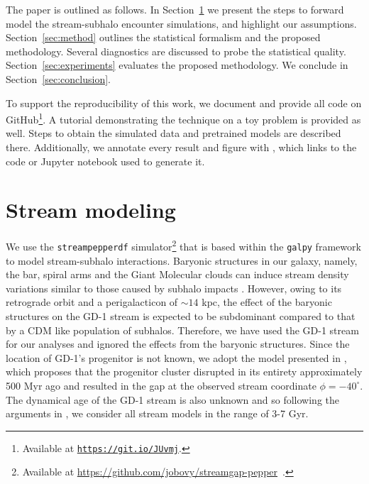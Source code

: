 \documentclass[fleqn,usenatbib]{mnras}
\begin{document}
\bigskip

The paper is outlined as follows. In Section~\ref{sec:stream_modeling} we present the steps to forward model the stream-subhalo encounter simulations, and highlight our assumptions.
Section~\ref{sec:method} outlines the statistical formalism and the proposed methodology.
Several diagnostics are discussed to probe the statistical quality.
Section~\ref{sec:experiments} evaluates the proposed methodology.
We conclude in Section~\ref{sec:conclusion}. 

\medskip

To support the reproducibility of this work,
we document and provide all code on GitHub\footnote{Available at \href{https://github.com/JoeriHermans/constraining-dark-matter-with-stellar-streams-and-ml}{\texttt{https://git.io/JUvmj}}.}.
A tutorial demonstrating the technique on a toy problem is provided as well.
Steps to obtain the simulated data and pretrained models are described there.
Additionally, we annotate every result and figure with , which links to the code or Jupyter notebook used to generate it.


\section{Stream modeling}
\label{sec:stream_modeling}

We use the \texttt{streampepperdf}
simulator\footnote{Available at \url{https://github.com/jobovy/streamgap-pepper}~.} 
that is based
within the \texttt{galpy} framework \citep{bovy2015galpy} to model stream-subhalo interactions. 
Baryonic structures in our galaxy, namely, the bar, spiral arms and the Giant Molecular clouds can induce stream density variations similar to those caused by subhalo impacts \citep{Amorisco2016,Erkal2017,Pearson2017,banik2019effects}. However, owing to its retrograde orbit and a perigalacticon of $\sim 14$ kpc, the effect of the baryonic structures on the GD-1 stream \citep{Grillmair2006} is expected to be subdominant compared to that by a CDM like population of subhalos. Therefore, we have used the GD-1 stream for our analyses and ignored the effects from the baryonic structures. Since the location of GD-1's progenitor is not known, we adopt the model presented in \citet{Webb_2019}, which proposes that the progenitor cluster disrupted in its entirety approximately 500 Myr ago and resulted in the gap at the observed stream coordinate $\phi = -40^{\circ}$. The dynamical age of the GD-1 stream is also unknown and so following the arguments in \citep{banik2019evidence}, we consider all stream models in the range of 3-7 Gyr.
\end{document}
